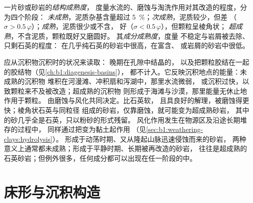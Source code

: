 \begin{definition}\label{def:b1:clastic-sediments:maturity}
一片砂或砂岩的\emph{结构成熟度}，
度量水流的、磨蚀与淘洗作用对其改造的程度，分为四个阶段：
\emph{未成熟}，泥质杂基含量超过
\qty{5}{\percent}；\emph{次成熟}，泥质较少，但差
（$\sigma > 0.5\,\varphi$）；\emph{成熟}，泥质很少或不含，
好（$\sigma < 0.5\,\varphi$），但颗粒呈棱角状；
\emph{超成熟}，不含泥质，颗粒既好又磨圆好。
其\emph{成分成熟度}，度量
不稳定与岩屑被去除、只剩石英的程度：
在几乎纯石英的砂岩中很高，在富含、
或岩屑的砂岩中很低。
\end{definition}

应从沉积物沉积时的状况来读取：
晚期在孔隙中结晶的，
以及把颗粒胶结在一起的胶结物（见\cref{ch:b1:diagenesis-basins}），
都不计入。它反映沉积地点的能量：未成熟的沉积物
堆积在河漫滩、冲积扇和泻湖中，那里水流微弱，
或沉积过快，以致颗粒来不及被改造；超成熟的沉积物
则形成于海滩与沙漠，那里能量无休止地作用于颗粒。
由磨蚀与风化共同决定。比石英软，
且具良好的解理，被磨蚀得更快；棱角状石英与同粒径
组成的砂岩，仅靠磨蚀，就可能变为超成熟砂岩，
其中的砂几乎全是石英，只以粉砂的形式残留。
风化作用发生在物源区及沿途长期堆存的过程中，
同样通过把变为黏土起作用
（见\cref{sec:b1:weathering-clays:hydrolysis}）。
形成于动荡时期、又从隆起山脉迅速侵蚀而来的砂岩，
两种意义上通常都未成熟；形成于平静时期、长期被再改造的砂岩，
往往是超成熟的石英砂岩；但例外很多，任何成分都可以出现在任一阶段的中。

\section{床形与沉积构造}\label{sec:b1:clastic-sediments:bedforms}

